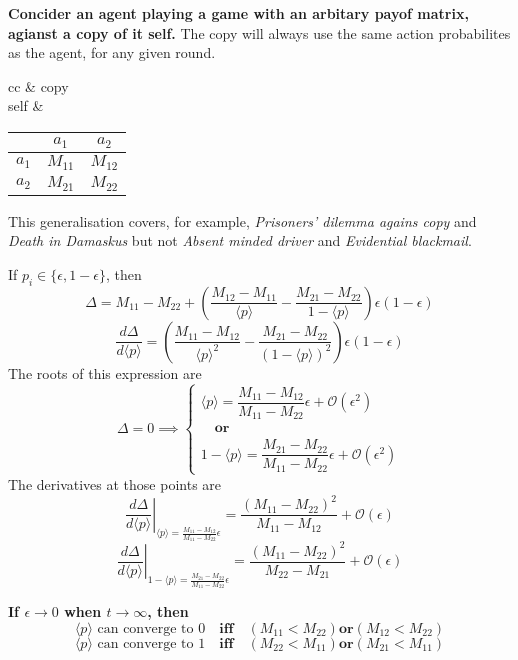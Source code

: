\documentclass[a4paper]{article}
\newcommand{\ep}{\langle p \rangle}
\newcommand{\ord}{\mathcal{O}}
\begin{document}
\textbf{Concider an agent playing a game with an arbitary payof matrix, agianst a copy of it self.} The copy will always use the same action probabilites as the agent, for any given round.

\begin{center}
\begin{tabular}{cc}
	& copy\\
	self
	& \begin{tabular}{c|c|c|}
		& $a_1$ & $a_2$ \\
		\hline
		$a_1$ & $M_{11}$ & $M_{12}$ \\
		\hline
		$a_2$ & $M_{21}$ & $M_{22}$ \\
		\hline
	\end{tabular}
\end{tabular}
\end{center}

This generalisation covers, for example, \textit{Prisoners' dilemma agains copy} and \textit{Death in Damaskus} but not \textit{Absent minded driver} and \textit{Evidential blackmail}.

If $p_i\in\{\epsilon,1-\epsilon\}$, then
\begin{equation}
	\Delta = M_{11} - M_{22} 
	+ \left(\frac{M_{12}-M_{11}}{\ep} - \frac{M_{21}-M_{22}}{1-\ep}\right)
	\epsilon(1-\epsilon)
\end{equation}
\begin{equation}
	\frac{d\Delta}{d\ep} = 
	\left(\frac{M_{11}-M_{12}}{\ep^2} - \frac{M_{21}-M_{22}}{(1-\ep)^2}\right)\epsilon(1-\epsilon)
\end{equation}
The roots of this expression are
\begin{equation}
	\Delta = 0 \implies 
	\begin{cases}
		\ep = \dfrac{M_{11}-M_{12}}{M_{11}-M_{22}}\epsilon 
			  + \ord(\epsilon^2)\\
		\quad \textbf{or}\\
		1 - \ep = \dfrac{M_{21}-M_{22}}{M_{11}-M_{22}}\epsilon
			  	  + \ord(\epsilon^2)
	\end{cases}
\end{equation}
The derivatives at those points are
\begin{equation}
	\left.\frac{d\Delta}{d\ep}\right|_{\ep = \frac{M_{11}-M_{12}}{M_{11}-M_{22}}\epsilon}
	= \frac{(M_{11}-M_{22})^2}{M_{11}-M_{12}} + \ord(\epsilon)
\end{equation}
\begin{equation}
	\left.\frac{d\Delta}{d\ep}\right|_{1-\ep = \frac{M_{21}-M_{22}}{M_{11}-M_{22}}\epsilon}
	= \frac{(M_{11}-M_{22})^2}{M_{22}-M_{21}} + \ord(\epsilon)
\end{equation}

\textbf{If $\epsilon\rightarrow0$ when $t\rightarrow\infty$, then} 
\begin{equation}
	\ep \text{ can converge to 0} \quad\textbf{iff}\quad (M_{11}<M_{22})\textbf{or}(M_{12}<M_{22})
\end{equation}
\begin{equation}
	\ep \text{ can converge to 1} \quad\textbf{iff}\quad (M_{22}<M_{11})\textbf{or}(M_{21}<M_{11})
\end{equation}
\end{document}
